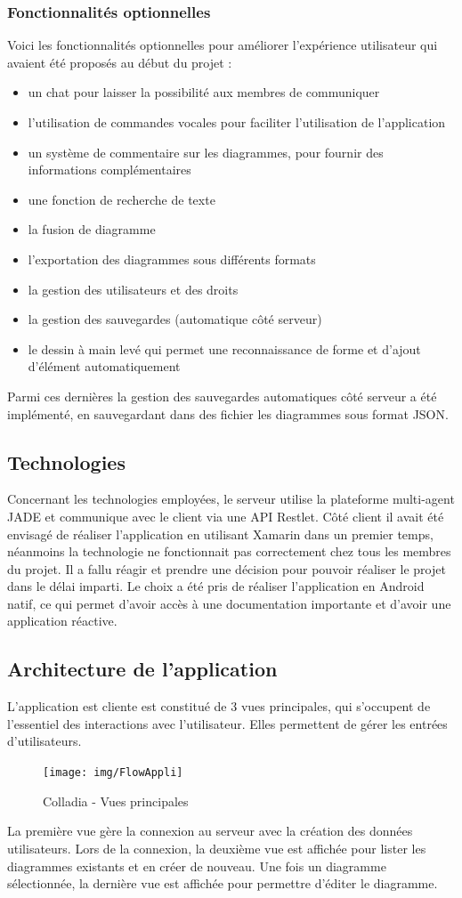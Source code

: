 \subsubsection{Fonctionnalités optionnelles}
Voici les fonctionnalités optionnelles pour améliorer l'expérience utilisateur qui avaient été proposés au début du projet :
\begin{itemize}
\item un chat pour laisser la possibilité aux membres de communiquer
\item l'utilisation de commandes vocales pour faciliter l'utilisation de l'application
\item un système de commentaire sur les diagrammes, pour fournir des informations complémentaires
\item une fonction de recherche de texte
\item la fusion de diagramme
\item l'exportation des diagrammes sous différents formats
\item la gestion des utilisateurs et des droits
\item la gestion des sauvegardes (automatique côté serveur)
\item le dessin à main levé qui permet une reconnaissance de forme et d'ajout d'élément automatiquement
\end{itemize}
Parmi ces dernières la gestion des sauvegardes automatiques côté serveur a été implémenté, en sauvegardant dans des fichier les diagrammes sous format JSON.

\subsection{Technologies}
Concernant les technologies employées, le serveur utilise la plateforme multi-agent JADE et communique avec le client via une API Restlet.
Côté client il avait été envisagé de réaliser l'application en utilisant Xamarin dans un premier temps, néanmoins la technologie ne fonctionnait pas correctement chez tous les membres du projet. Il a fallu réagir et prendre une décision pour pouvoir réaliser le projet dans le délai imparti. Le choix a été pris de réaliser l'application en Android natif, ce qui permet d'avoir accès à une documentation importante et d'avoir une application réactive.

\subsection{Architecture de l'application}
L'application est cliente est constitué de 3 vues principales, qui s'occupent de l'essentiel des interactions avec l'utilisateur.
Elles permettent de gérer les entrées d'utilisateurs.
	\begin{figure}[!h]
		\centering
		\texttt{[image: img/FlowAppli]}
		\caption{Colladia - Vues principales}
	\end{figure}
La première vue gère la connexion au serveur avec la création des données utilisateurs. Lors de la connexion, la deuxième vue est affichée pour lister les diagrammes existants et en créer de nouveau.
Une fois un diagramme sélectionnée, la dernière vue est affichée pour permettre d'éditer le diagramme. 

